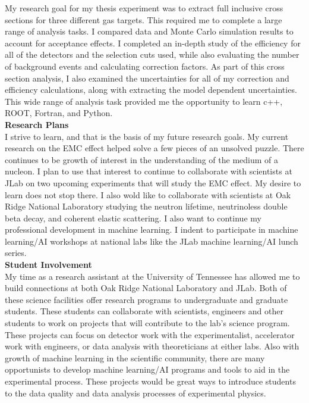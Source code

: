 \documentclass[12pt,letterpaper]{article}
\begin{document}
\indent My research goal for my thesis experiment was to extract full inclusive cross sections for three different gas targets. This required me to complete a large range of analysis tasks. I compared data and Monte Carlo simulation results to account for acceptance effects. I completed an in-depth study of the efficiency for all of the detectors and the selection cuts used, while also evaluating the number of background events and calculating correction factors. As part of this cross section analysis, I also examined the uncertainties for all of my correction and efficiency calculations, along with extracting the model dependent uncertainties. This wide range of analysis task provided me the opportunity to learn c++, ROOT, Fortran, and Python.\\

\noindent\textbf{Research Plans}\\
\indent I strive to learn, and that is the basis of my future research goals. My current research on the EMC effect helped solve a few pieces of an unsolved puzzle. There continues to be growth of interest in the understanding of the medium of a nucleon. I plan to use that interest to continue to collaborate with scientists at JLab on two upcoming experiments that will study the EMC effect. My desire to learn does not stop there. I also wold like to collaborate with scientists at Oak Ridge National Laboratory studying the neutron lifetime, neutrinoless double beta decay, and coherent elastic scattering. I also want to continue my professional development in machine learning. I indent to participate in machine learning/AI workshops at national labs like the JLab machine learning/AI lunch series.\\

\noindent\textbf{Student Involvement}\\
\indent My time as a research assistant at the University of Tennessee has allowed me to build connections at both Oak Ridge National Laboratory and JLab. Both of these science facilities offer research programs to undergraduate and graduate students. These students can collaborate with scientists, engineers and other students to work on projects that will contribute to the lab's science program. These projects can focus on detector work with the experimentalist, accelerator work with engineers, or data analysis with theoreticians at either labs. Also with growth of machine learning in the scientific community, there are many opportunists to develop machine learning/AI programs and tools to aid in the experimental process. These projects would be great ways to introduce students to the data quality and data analysis processes of experimental physics.  
\end{document}
